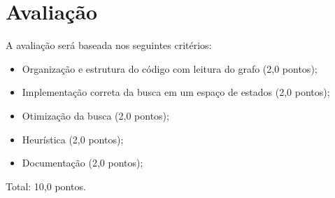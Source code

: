 \chapter{Avaliação}

A avaliação será baseada nos seguintes critérios:

\begin{itemize}
    \item Organização e estrutura do código com leitura do grafo (2,0 pontos);
    \item Implementação correta da busca em um espaço de estados (2,0 pontos);
    \item Otimização da busca (2,0 pontos);
    \item Heurística (2,0 pontos);
    \item Documentação (2,0 pontos);
\end{itemize}

Total: 10,0 pontos.